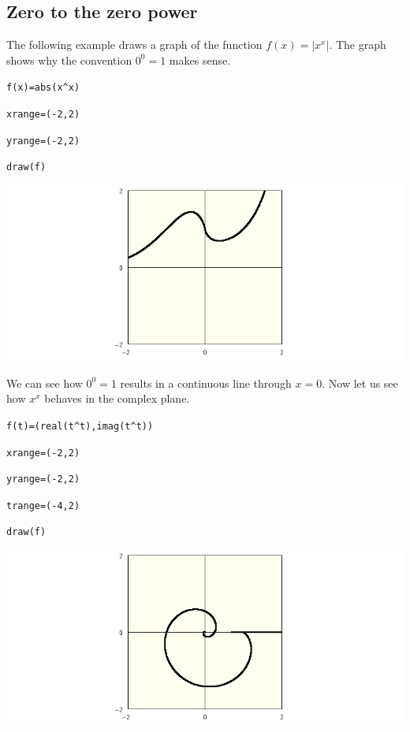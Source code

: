 \subsection{Zero to the zero power}

The following example draws a graph of the function $f(x)=|x^x|$.
The graph shows why the convention $0^0=1$ makes sense.

\medskip
\verb$f(x)=abs(x^x)$

\verb$xrange=(-2,2)$

\verb$yrange=(-2,2)$

\verb$draw(f)$

\begin{center}
\includegraphics[scale=0.4]{zerozero.png}
\end{center}

\medskip
\noindent
We can see how $0^0=1$ results in a continuous line through $x=0$.
Now let us see how $x^x$ behaves in the complex plane.

\medskip
\verb$f(t)=(real(t^t),imag(t^t))$

\verb$xrange=(-2,2)$

\verb$yrange=(-2,2)$

\verb$trange=(-4,2)$

\verb$draw(f)$

\begin{center}
\includegraphics[scale=0.4]{zerozero2.png}
\end{center}
